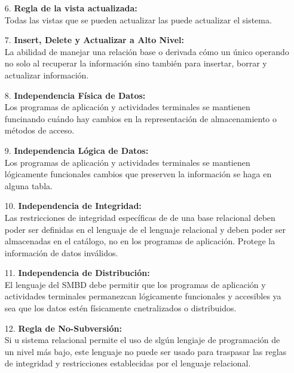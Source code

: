 \documentclass[a4paper, 12pt]{report}
\begin{document}
{\begin{enumerate}
{\begin{itemize}
        \item{Visibilización de la definición.}
        \item{Manipulación de datos}
        \item{Restricciones de integridad.}
        \item{Autorizaciones.}
        \item{Bordes de transacciones (inicio, commit, etc.).}
    \end{itemize}
}
\item[6.]{\textbf{Regla de la vista actualizada:}\\
    Todas las vistas que se pueden actualizar las puede actualizar el sistema.
}
\item[7.]{\textbf{Insert, Delete y Actualizar a Alto Nivel:}\\
    La abilidad de manejar una relación base o derivada cómo un único operando
    no solo al recuperar la información sino también para insertar, borrar y
    actualizar información.
}
\item[8.]{\textbf{Independencia Física de Datos:}\\
    Los programas de aplicación y actividades terminales se mantienen funcinando
    cuándo hay cambios en la representación de almacenamiento o métodos de acceso.
}
\item[9.]{\textbf{Independencia Lógica de Datos:}\\
    Los programas de aplicación y actividades terminales se mantienen lógicamente
    funcionales cambios que preserven la información se haga en alguna tabla.
}
\item[10.]{\textbf{Independencia de Integridad:}\\
    Las restricciones de integridad específicas de de una base relacional deben
    poder ser definidas en el lenguaje de el lenguaje relacional y deben poder
    ser almacenadas en el catálogo, no en los programas de aplicación. Protege la
    información de datos inválidos.
}
\item[11.]{\textbf{Independencia de Distribución:}\\
    El lenguaje del SMBD debe permitir que los programas de aplicación y actividades
    terminales permanezcan lógicamente funcionales y accesibles ya sea que los datos
    estén físicamente cnetralizados o distribuidos.
}
\item[12.]{\textbf{Regla de No-Subversión:}\\
    Si u sistema relacional permite el uso de slgún lengiaje de programación de
    un nivel más bajo, este lenguaje no puede ser usado para traspasar las reglas
    de integridad y restricciones establecidas por el lenguaje relacional.
}
\end{enumerate}
}
\end{document}
